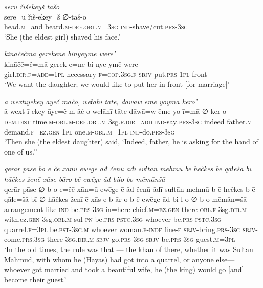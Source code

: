 \ea \label{ŽH.54}
\textit{serū řīšekeyš tāšo} \\ 
\gll sere=ū řīš-ekey=š ∅-tāš-o \\ 
 head\textsc{.m}=and beard\textsc{.m}\textsc{-def}\textsc{.obl}\textsc{.m}\textsc{=3sg} \textsc{ind-}shave/cut\textsc{.prs}\textsc{-3sg} \\ 
\glt `She (the eldest girl) shaved his face.'
\z 
 
\ea \label{ŽH.56}
\textit{kināčēčmā gerekene binyeymē were’} \\ 
\gll kināčē=č=mā gerek-e=ne bi-nye-ymē were \\ 
 girl\textsc{.dir}\textsc{\textsc{.f}}\textsc{=add}\textsc{=1pl} necessary\textsc{-f}\textsc{=cop}\textsc{.3sg}\textsc{\textsc{.f}} \textsc{sbjv-}put\textsc{.prs} \textsc{1pl} front \\ 
\glt `We want the daughter; we would like to put her in front [for marriage]'
\z 
 
\ea \label{ŽH.57}
\textit{ā wextīyekey āyeč māčo, weɫāhī tāte, dāwāw ēme yoymā kero’} \\ 
\gll ā wext-ī-ekey āye=č m-āč-o weɫāhī tāte dāwā=w ēme yo-ī=mā ∅-ker-o \\ 
 \textsc{dem.dist} time\textsc{.m}\textsc{-obl}\textsc{.m}\textsc{-def}\textsc{.obl}\textsc{.m} 3sg\textsc{\textsc{.f}}\textsc{.dir}\textsc{=add} \textsc{ind-}say\textsc{.prs}\textsc{-3sg} indeed father\textsc{.m} demand\textsc{\textsc{.f}}\textsc{=ez}\textsc{.gen} \textsc{1pl} one\textsc{.m}\textsc{-obl}\textsc{.m}\textsc{=1pl} \textsc{ind-}do\textsc{.prs}\textsc{-3sg} \\ 
\glt `Then she (the eldest daughter) said, ‘Indeed, father, he is asking for the hand of one of us.’'
\z 
 
\ea \label{ŽH.64}
\textit{qerār pāse bo e čē xānū ewēgē āđ čenū āđī suɫtān mehmū bē hečkes bē qāɫešā bī hāčkes ženē xāse bāro bē ewēge āđ bilo bo mēmānšā} \\ 
\gll qerār pāse ∅-b-o e=čē xān=ū ewēge-ē āđ čenū āđī suɫtān mehmū b-ē hečkes b-ē qāɫe=šā bī-∅ hāčkes ženī-ē xās-e b-ār-o b-ē ewēge āđ bi-l-o ∅-b-o mēmān=šā \\ 
 arrangement like \textsc{ind-}be\textsc{.prs}\textsc{-3sg} in=here chief\textsc{.m}\textsc{=ez}\textsc{.gen} there\textsc{-obl}\textsc{\textsc{.f}} 3sg\textsc{.dir}\textsc{.m} with.ez\textsc{.gen} 3sg\textsc{.obl}\textsc{.m} sul \textsc{pn} be\textsc{.prs}\textsc{-pstc}\textsc{.3sg} whoever be\textsc{.prs}\textsc{-pstc}\textsc{.3sg} quarrel\textsc{\textsc{.f}}\textsc{=3pl} be\textsc{.pst}\textsc{-3sg}\textsc{.m} whoever woman\textsc{\textsc{.f}}\textsc{-indf} fine\textsc{-f} \textsc{sbjv-}bring\textsc{.prs}\textsc{-3sg} \textsc{sbjv-}come\textsc{.prs}\textsc{.3sg} there \textsc{3sg}\textsc{.dir}\textsc{.m} \textsc{sbjv-}go\textsc{.prs}\textsc{-3sg} \textsc{sbjv-}be\textsc{.prs}\textsc{-3sg} guest\textsc{.m}\textsc{=3pl} \\ 
\glt `In the old times, the rule was that — the khan of there, whether it was Sultan Mahmud, with whom he (Hayas) had got into a quarrel, or anyone else— whoever got married and took a beautiful wife, he (the king) would go [and] become their guest.'
\z 
 
